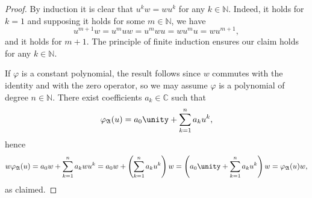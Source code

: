 \begin{proof}
    By induction it is clear that \(u^kw = wu^k\) for any \(k \in \mathbb{N}\). Indeed, it holds for \(k = 1\) and supposing it holds for some \(m \in \mathbb{N}\), we have
    \begin{equation*}
        u^{m+1}w = u^{m}uw = u^mwu = wu^{m}u = wu^{m+1},
    \end{equation*}
    and it holds for \(m + 1\). The principle of finite induction ensures our claim holds for any \(k \in \mathbb{N}\).

    If \(\varphi\) is a constant polynomial, the result follows since \(w\) commutes with the identity and with the zero operator, so we may assume \(\varphi\) is a polynomial of degree \(n \in \mathbb{N}\). There exist coefficients \(a_k \in \mathbb{C}\) such that
    \begin{equation*}
        \varphi_{\algebra{A}}(u) = a_0 \unity + \sum_{k=1}^n a_k u^k,
    \end{equation*}
    hence
    \begin{equation*}
        w\varphi_{\algebra{A}}(u) = a_0 w + \sum_{k = 1}^n a_k wu^k = a_0 w + \left(\sum_{k = 1}^n a_{k}u^{k}\right)w = \left(a_0 \unity + \sum_{k=1}^n a_k u^k\right) w= \varphi_{\algebra{A}}(u) w,
    \end{equation*}
    as claimed.
\end{proof}

